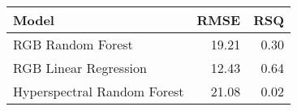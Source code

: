 \begin{longtable}{lrr}
\toprule
Model & RMSE & RSQ \\ 
\midrule
RGB Random Forest & 19.21 & 0.30 \\ 
RGB Linear Regression & 12.43 & 0.64 \\ 
Hyperspectral Random Forest & 21.08 & 0.02 \\ 
\bottomrule
\end{longtable}

